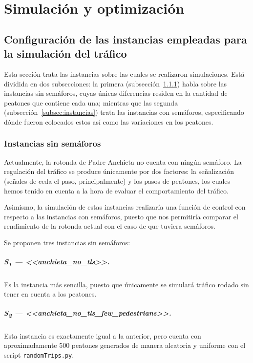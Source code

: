 \chapter{Simulación y optimización}
\label{cap:simulacion}

\section{Configuración de las instancias empleadas para la simulación del tráfico}

Esta sección trata las instancias sobre las cuales se realizaron simulaciones. Está dividida en dos subsecciones: la primera (subsección~\ref{subsec:instancias-nosemaf}) habla sobre las instancias sin semáforos, cuyas únicas diferencias residen en la cantidad de peatones que contiene cada una; mientras que las segunda (subsección~\ref{subsec:instancias}) trata las instancias con semáforos, especificando dónde fueron colocados estos así como las variaciones en los peatones.

\subsection{Instancias sin semáforos}
\label{subsec:instancias-nosemaf}

Actualmente, la rotonda de Padre Anchieta no cuenta con ningún semáforo. La regulación del tráfico se produce únicamente por dos factores: la señalización (señales de ceda el paso, principalmente) y los pasos de peatones, los cuales hemos tenido en cuenta a la hora de evaluar el comportamiento del tráfico.

Asimismo, la simulación de estas instancias realizaría una función de control con respecto a las instancias con semáforos, puesto que nos permitiría comparar el rendimiento de la rotonda actual con el caso de que tuviera semáforos.

Se proponen tres instancias sin semáforos:

\paragraph{S\textsubscript{1} --- <<anchieta\_no\_tls>>.} Es la instancia más sencilla, puesto que únicamente se simulará tráfico rodado sin tener en cuenta a los peatones.


\paragraph{S\textsubscript{2} --- <<anchieta\_no\_tls\_few\_pedestrians>>.} Esta instancia es exactamente igual a la anterior, pero cuenta con aproximadamente 500 peatones generados de manera aleatoria y uniforme con el script \texttt{randomTrips.py}.


